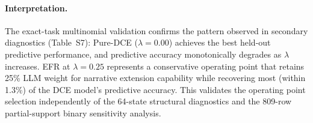 \paragraph{Interpretation.} The exact-task multinomial validation confirms the pattern observed in secondary diagnostics (Table~S7): Pure-DCE ($\lambda = 0.00$) achieves the best held-out predictive performance, and predictive accuracy monotonically degrades as $\lambda$ increases. EFR at $\lambda = 0.25$ represents a conservative operating point that retains 25\% LLM weight for narrative extension capability while recovering most (within 1.3\%) of the DCE model's predictive accuracy. This validates the operating point selection independently of the 64-state structural diagnostics and the 809-row partial-support binary sensitivity analysis.
